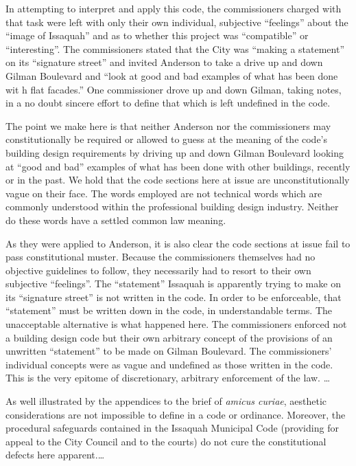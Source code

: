 In attempting to interpret and apply this code, the commissioners charged with
that task were left with only their own individual, subjective ``feelings''
about the ``image of Issaquah'' and as to whether this project was
``compatible'' or ``interesting''. The commissioners stated that the City was
``making a statement'' on its ``signature street'' and invited Anderson to take
a drive up and down Gilman Boulevard and ``look at good and bad examples of what
has been done wit h flat facades.'' One commissioner drove up and down Gilman,
taking notes, in a no doubt sincere effort to define that which is left
undefined in the code.

The point we make here is that neither Anderson nor the commissioners may
constitutionally be required or allowed to guess at the meaning of the code's
building design requirements by driving up and down Gilman Boulevard looking at
``good and bad'' examples of what has been done with other buildings, recently
or in the past. We hold that the code sections here at issue are
unconstitutionally vague on their face. The words employed are not technical
words which are commonly understood within the professional building design
industry. Neither do these words have a settled common law meaning.

As they were applied to Anderson, it is also clear the code sections at issue
fail to pass constitutional muster. Because the commissioners themselves had no
objective guidelines to follow, they necessarily had to resort to their own
subjective ``feelings''. The ``statement'' Issaquah is apparently trying to make
on its ``signature street'' is not written in the code. In order to be
enforceable, that ``statement'' must be written down in the code, in
understandable terms. The unacceptable alternative is what happened here. The
commissioners enforced not a building design code but their own arbitrary
concept of the provisions of an unwritten ``statement'' to be made on Gilman
Boulevard. The commissioners' individual concepts were as vague and undefined as
those written in the code. This is the very epitome of discretionary, arbitrary
enforcement of the law. \ldots

As well illustrated by the appendices to the brief of \emph{amicus curiae},
aesthetic considerations are not impossible to define in a code or ordinance.
Moreover, the procedural safeguards contained in the Issaquah Municipal Code
(providing for appeal to the City Council and to the courts) do not cure the
constitutional defects here apparent.\ldots

